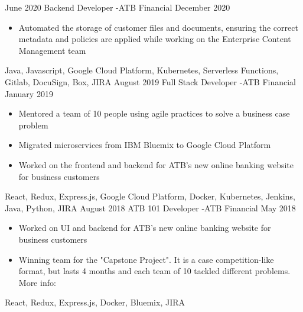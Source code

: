 
\begin{experiences}
  \experience
    {June 2020}   {Backend Developer -}{ATB Financial}{}
    {December 2020} {
                      \begin{itemize}
                        \item Automated the storage of customer files and
                          documents, ensuring the correct metadata and policies
                          are applied while working on the Enterprise Content
                          Management team
                      \end{itemize}
                    }
                    {
                        Java,
                        Javascript,
                        Google Cloud Platform,
                        Kubernetes,
                        Serverless Functions,
                        Gitlab,
                        DocuSign,
                        Box,
                        JIRA
                    }
  \emptySeparator
  \experience
    {August 2019}   {Full Stack Developer -}{ATB Financial}{}
    {January 2019} {
                      \begin{itemize}
                        \item Mentored a team of 10 people using agile
                          practices to solve a business case problem
                        \item Migrated microservices from IBM Bluemix to Google
                          Cloud Platform
                        \item Worked on the frontend and backend
                          for ATB's new online banking website for business
                          customers
                      \end{itemize}
                    }
                    {
                        React,
                        Redux,
                        Express.js,
                        Google Cloud Platform,
                        Docker,
                        Kubernetes,
                        Jenkins,
                        Java,
                        Python,
                        JIRA
                    }
  \emptySeparator
  \experience
  {August 2018}   {ATB 101 Developer -}{ATB Financial}{}
  {May 2018} {
                    \begin{itemize}
                      \item Worked on UI and backend for ATB's new online banking website for business customers
                      \item Winning team for the "Capstone Project". It is a case competition-like format,
                      but lasts 4 months and each team of 10 tackled different problems.
                      More info: 
                    \end{itemize}
                  }
                  {
                      React,
                      Redux,
                      Express.js,
                      Docker,
                      Bluemix,
                      JIRA
                  }
\end{experiences}
